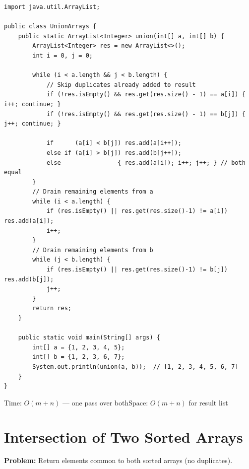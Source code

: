 \documentclass[12pt,a4paper,oneside]{book}
\begin{document}
\begin{lstlisting}[caption={Union of Two Sorted Arrays --- Two Pointer, O(m+n)}]
import java.util.ArrayList;

public class UnionArrays {
    public static ArrayList<Integer> union(int[] a, int[] b) {
        ArrayList<Integer> res = new ArrayList<>();
        int i = 0, j = 0;

        while (i < a.length && j < b.length) {
            // Skip duplicates already added to result
            if (!res.isEmpty() && res.get(res.size() - 1) == a[i]) { i++; continue; }
            if (!res.isEmpty() && res.get(res.size() - 1) == b[j]) { j++; continue; }

            if      (a[i] < b[j]) res.add(a[i++]);
            else if (a[i] > b[j]) res.add(b[j++]);
            else                { res.add(a[i]); i++; j++; } // both equal
        }
        // Drain remaining elements from a
        while (i < a.length) {
            if (res.isEmpty() || res.get(res.size()-1) != a[i]) res.add(a[i]);
            i++;
        }
        // Drain remaining elements from b
        while (j < b.length) {
            if (res.isEmpty() || res.get(res.size()-1) != b[j]) res.add(b[j]);
            j++;
        }
        return res;
    }

    public static void main(String[] args) {
        int[] a = {1, 2, 3, 4, 5};
        int[] b = {1, 2, 3, 6, 7};
        System.out.println(union(a, b));  // [1, 2, 3, 4, 5, 6, 7]
    }
}
\end{lstlisting}

\begin{complexity}
Time: $O(m + n)$ --- one pass over both\quad Space: $O(m + n)$ for result list
\end{complexity}

\section{Intersection of Two Sorted Arrays}

\textbf{Problem:} Return elements common to both sorted arrays (no duplicates).
\end{document}
